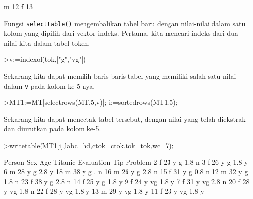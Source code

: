 \documentclass[a4paper,11pt,oneside,enabledeprecatedfontcommands]{scrbook}
\newenvironment{eulernotebook}{}{}
\newenvironment{eulercomment}{\par\medskip\noindent}{\par\medskip}
\begin{document}
\begin{eulernotebook}
\begin{euleroutput}
			         m        12
			         f        13
		\end{euleroutput}
		\begin{eulercomment}
			Fungsi \texttt{selecttable()} mengembalikan tabel baru dengan nilai-nilai dalam satu kolom yang dipilih dari
			vektor indeks. Pertama, kita mencari indeks dari dua nilai kita dalam tabel token.
		\end{eulercomment}
		\begin{eulerprompt}
			>v:=indexof(tok,["g","vg"])
		\end{eulerprompt}
		\begin{euleroutput}
			[5,  6]
		\end{euleroutput}
		\begin{eulercomment}
			Sekarang kita dapat memilih baris-baris tabel yang memiliki salah satu nilai dalam \texttt{v} pada kolom
			ke-5-nya.
		\end{eulercomment}
		\begin{eulerprompt}
			>MT1:=MT[selectrows(MT,5,v)]; i:=sortedrows(MT1,5);
		\end{eulerprompt}
		\begin{eulercomment}
			Sekarang kita dapat mencetak tabel tersebut, dengan nilai yang telah diekstrak dan diurutkan pada
			kolom ke-5.
		\end{eulercomment}
		\begin{eulerprompt}
			>writetable(MT1[i],labc=hd,ctok=ctok,tok=tok,wc=7);
		\end{eulerprompt}
		\begin{euleroutput}
			 Person    Sex    Age Titanic Evaluation    Tip Problem
			      2      f     23       y          g    1.8       n
			      3      f     26       y          g    1.8       y
			      6      m     28       y          g    2.8       y
			     18      m     38       y          g      .       n
			     16      m     26       y          g    2.8       n
			     15      f     31       y          g    0.8       n
			     12      m     32       y          g    1.8       n
			     23      f     38       y          g    2.8       n
			     14      f     25       y          g    1.8       y
			      9      f     24       y         vg    1.8       y
			      7      f     31       y         vg    2.8       n
			     20      f     28       y         vg    1.8       n
			     22      f     28       y         vg    1.8       y
			     13      m     29       y         vg    1.8       y
			     11      f     23       y         vg    1.8       y
		\end{euleroutput}

\end{eulernotebook}
\end{document}
